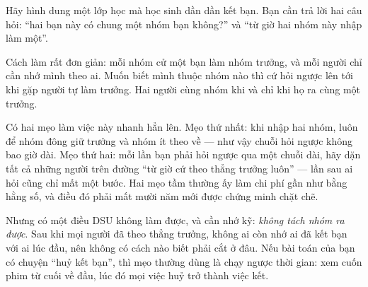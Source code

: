 \documentclass[../../algorithm.tex]{subfiles}
\begin{document}
\begin{dongian}
Hãy hình dung một lớp học mà học sinh dần dần kết bạn. Bạn cần trả lời hai câu hỏi: ``hai bạn này có chung một nhóm bạn không?'' và ``từ giờ hai nhóm này nhập làm một''.

Cách làm rất đơn giản: mỗi nhóm cử một bạn làm nhóm trưởng, và mỗi người chỉ cần nhớ mình theo ai. Muốn biết mình thuộc nhóm nào thì cứ hỏi ngược lên tới khi gặp người tự làm trưởng. Hai người cùng nhóm khi và chỉ khi họ ra cùng một trưởng.

Có hai mẹo làm việc này nhanh hẳn lên. Mẹo thứ nhất: khi nhập hai nhóm, luôn để nhóm đông giữ trưởng và nhóm ít theo về --- như vậy chuỗi hỏi ngược không bao giờ dài. Mẹo thứ hai: mỗi lần bạn phải hỏi ngược qua một chuỗi dài, hãy dặn tất cả những người trên đường ``từ giờ cứ theo thẳng trưởng luôn'' --- lần sau ai hỏi cũng chỉ mất một bước. Hai mẹo tầm thường ấy làm chi phí gần như bằng hằng số, và điều đó phải mất mười năm mới được chứng minh chặt chẽ.

Nhưng có một điều DSU không làm được, và cần nhớ kỹ: \emph{không tách nhóm ra được}. Sau khi mọi người đã theo thẳng trưởng, không ai còn nhớ ai đã kết bạn với ai lúc đầu, nên không có cách nào biết phải cắt ở đâu. Nếu bài toán của bạn có chuyện ``huỷ kết bạn'', thì mẹo thường dùng là chạy ngược thời gian: xem cuốn phim từ cuối về đầu, lúc đó mọi việc huỷ trở thành việc kết.
\end{dongian}
\end{document}

